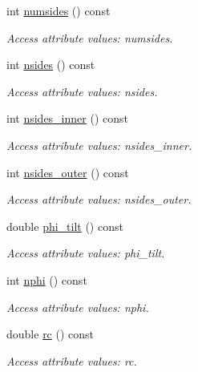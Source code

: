 \begin{DoxyCompactItemize}
int \hyperlink{struct_d_d4hep_1_1_x_m_l_1_1_dimension_afbf7151c9900dd453d2c634e35a0c90e}{numsides} () const
\begin{DoxyCompactList}\small\item\em Access attribute values\+: numsides. \end{DoxyCompactList}\item 
int \hyperlink{struct_d_d4hep_1_1_x_m_l_1_1_dimension_a05c50e5b309c1690faa51cdc0a5a9a6e}{nsides} () const
\begin{DoxyCompactList}\small\item\em Access attribute values\+: nsides. \end{DoxyCompactList}\item 
int \hyperlink{struct_d_d4hep_1_1_x_m_l_1_1_dimension_a514ed104814c4125cf1acfd78985c208}{nsides\+\_\+inner} () const
\begin{DoxyCompactList}\small\item\em Access attribute values\+: nsides\+\_\+inner. \end{DoxyCompactList}\item 
int \hyperlink{struct_d_d4hep_1_1_x_m_l_1_1_dimension_ad7f9c1769d77fe088a46463822d36319}{nsides\+\_\+outer} () const
\begin{DoxyCompactList}\small\item\em Access attribute values\+: nsides\+\_\+outer. \end{DoxyCompactList}\item 
double \hyperlink{struct_d_d4hep_1_1_x_m_l_1_1_dimension_a97807b4bec80b5b2edc22a7fcd7f1442}{phi\+\_\+tilt} () const
\begin{DoxyCompactList}\small\item\em Access attribute values\+: phi\+\_\+tilt. \end{DoxyCompactList}\item 
int \hyperlink{struct_d_d4hep_1_1_x_m_l_1_1_dimension_a59b746f14ee8916be76fa4af54d16ce9}{nphi} () const
\begin{DoxyCompactList}\small\item\em Access attribute values\+: nphi. \end{DoxyCompactList}\item 
double \hyperlink{struct_d_d4hep_1_1_x_m_l_1_1_dimension_ada8d95127d37cb46b85183d577323f3a}{rc} () const
\begin{DoxyCompactList}\small\item\em Access attribute values\+: rc. \end{DoxyCompactList}\item 

\end{DoxyCompactItemize}
